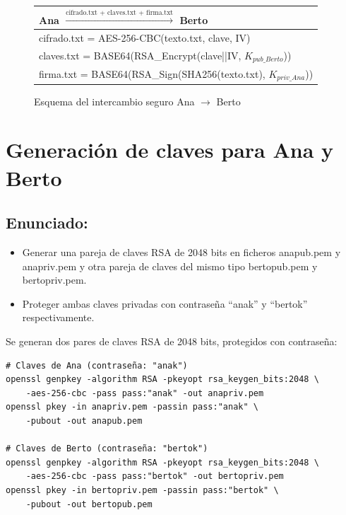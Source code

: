 \begin{figure}[H]
    \centering
    \begin{tabularx}{\textwidth}{|X|}
        \hline
        \textbf{Ana} $\xrightarrow{\text{cifrado.txt + claves.txt + firma.txt}}$ \textbf{Berto} \\
        \hline
        \small{cifrado.txt = AES-256-CBC(texto.txt, clave, IV)} \\
        \small{claves.txt = BASE64(RSA\_Encrypt(clave||IV, $K_{pub\_Berto}$))} \\
        \small{firma.txt = BASE64(RSA\_Sign(SHA256(texto.txt), $K_{priv\_Ana}$))} \\
        \hline
    \end{tabularx}
    \caption{Esquema del intercambio seguro Ana $\rightarrow$ Berto}
\end{figure}


\section{Generación de claves para Ana y Berto}
\subsection{Enunciado:}
\begin{itemize}[label=\textbullet]
    \item Generar una pareja de claves RSA de 2048 bits en ficheros anapub.pem y anapriv.pem y otra
    pareja de claves del mismo tipo bertopub.pem y bertopriv.pem.
    \item Proteger ambas claves privadas con contraseña ``anak'' y ``bertok'' respectivamente.
\end{itemize}
Se generan dos pares de claves RSA de 2048 bits, protegidos con contraseña:

\begin{lstlisting}[caption=Generación de claves RSA para Ana y Berto]
# Claves de Ana (contraseña: "anak")
openssl genpkey -algorithm RSA -pkeyopt rsa_keygen_bits:2048 \
    -aes-256-cbc -pass pass:"anak" -out anapriv.pem
openssl pkey -in anapriv.pem -passin pass:"anak" \
    -pubout -out anapub.pem

# Claves de Berto (contraseña: "bertok")
openssl genpkey -algorithm RSA -pkeyopt rsa_keygen_bits:2048 \
    -aes-256-cbc -pass pass:"bertok" -out bertopriv.pem
openssl pkey -in bertopriv.pem -passin pass:"bertok" \
    -pubout -out bertopub.pem
\end{lstlisting}

